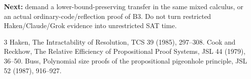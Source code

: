 \documentclass{article}
\begin{document}
\noindent\textbf{Next:} demand a lower-bound-preserving transfer in the
same mixed calculus, or an actual ordinary-code/reflection proof of B3.
Do not turn restricted Haken/Claude/Grok evidence into unrestricted SAT time.

\begin{thebibliography}{3}
 Haken, The Intractability of Resolution, TCS 39 (1985), 297--308.
 Cook and Reckhow, The Relative Efficiency of Propositional Proof Systems, JSL 44 (1979), 36--50.
 Buss, Polynomial size proofs of the propositional pigeonhole principle, JSL 52 (1987), 916--927.
\end{thebibliography}
\end{document}
